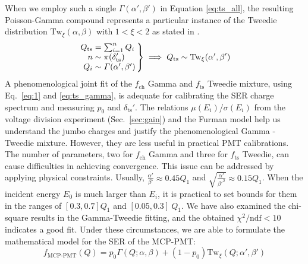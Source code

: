 When we employ such a single \(\varGamma(\alpha', \beta')\) in Equation \eqref{eq:ts_all}, the resulting Poisson-Gamma compound represents a particular instance of the Tweedie distribution $\mathrm{Tw}_{\xi}(\alpha,\beta)$ with \(1 < \xi < 2\) as stated in \cite{1991Tweedie}.
\begin{equation}
	\arraycolsep=1.4pt
	\label{eq:ts_gamma}
	\left.\begin{array}{rl}
		Q_{\text{ts}} & = \sum_{{i}=1}^{n} Q_{i}                 \\
		n             & \sim \mathrm{\pi}(\delta_{\mathrm{ts}}') \\
		Q_{i}         & \sim \varGamma(\alpha', \beta')
	\end{array}\right\} \implies
	Q_{\text{ts}} \sim \mathrm{Tw}_{\xi}(\alpha',\beta')
\end{equation}
A phenomenological joint fit of the \(f_\mathrm{ch}\) Gamma and \(f_\mathrm{ts}\) Tweedie mixture, using Eq.~\eqref{eq:1} and \eqref{eq:ts_gamma}, is adequate for calibrating the SER charge spectrum and measuring \(p_0\) and \(\delta_\text{ts}'\). The relations \(\mu(E_i)\)/\(\sigma(E_i)\) from the voltage division experiment (Sec.~\ref{sec:gain}) and the Furman model help us understand the jumbo charges and justify the phenomenological Gamma - Tweedie mixture. However, they are less useful in practical PMT calibrations.
The number of parameters, two for \(f_\mathrm{ch}\) Gamma and three for \(f_\mathrm{ts}\) Tweedie, can cause difficulties in achieving convergence. This issue can be addressed by applying physical constraints. Usually, $\frac{\alpha'}{\beta'}\approx 0.45Q_1$ and \(\sqrt{\frac{\alpha'}{\beta'^2}}\approx 0.15Q_1\). When the incident energy \(E_0\) is much larger than \(E_{i}\), it is practical to set bounds for them in the ranges of $[0.3,0.7]Q_1$ and $[0.05,0.3]~Q_1$.
We have also examined the chi-square results in the Gamma-Tweedie fitting, and the obtained $\chi^2/\mathrm{ndf}<10$ indicates a good fit. Under these circumstances, we are able to formulate the mathematical model for the SER of the MCP-PMT:
\begin{equation}
	\label{eq:GTmodel}
	f_{\text{MCP-PMT}}(Q) = p_0 \varGamma(Q; \alpha, \beta) + (1-p_0) \mathrm{Tw}_{\xi}(Q; \alpha', \beta')
\end{equation}

